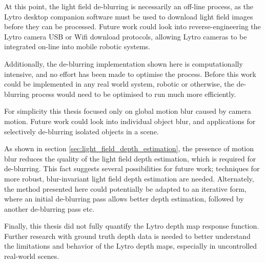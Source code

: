At this point, the light field de-blurring is necessarily an off-line process, as the Lytro desktop companion software must be used to download light field images before they can be processed.
Future work could look into reverse-engineering the Lytro camera USB or Wifi download protocols, allowing Lytro cameras to be integrated on-line into mobile robotic systems. 

Additionally, the de-blurring implementation shown here is computationally intensive, and no effort has been made to optimise the process.
Before this work could be implemented in any real world system, robotic or otherwise, the de-blurring process would need to be optimised to run much more efficiently.

For simplicity this thesis focused only on global motion blur caused by camera motion.
Future work could look into individual object blur, and applications for selectively de-blurring isolated objects in a scene.

As shown in section \ref{sec:light_field_depth_estimation}, the presence of motion blur reduces the quality of the light field depth estimation, which is required for de-blurring.
This fact suggests several possibilities for future work; techniques for more robust, blur-invariant light field depth estimation are needed.
Alternately, the method presented here could potentially be adapted to an iterative form, where an initial de-blurring pass allows better depth estimation, followed by another de-blurring pass etc.

Finally, this thesis did not fully quantify the Lytro depth map response function.
Further research with ground truth depth data is needed to better understand the limitations and behavior of the Lytro depth maps, especially in uncontrolled real-world scenes.

